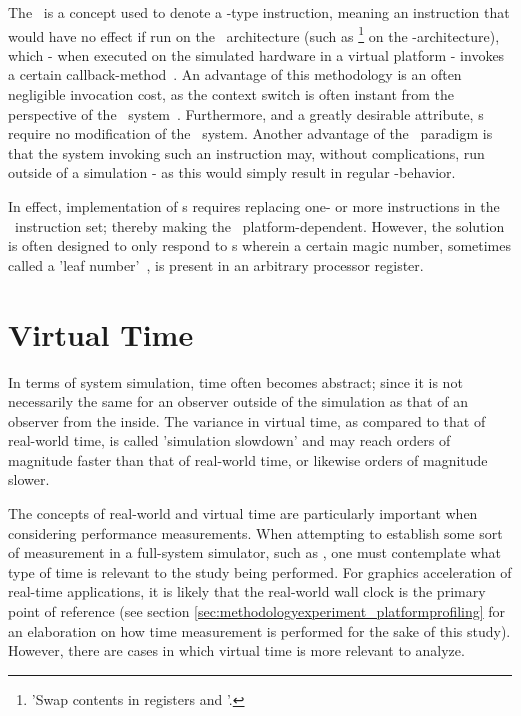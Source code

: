 The \dvttermmagicinstruction\ is a concept used to denote a -type instruction, meaning an instruction that would have no effect if run on the \dvttermtarget\ architecture (such as \footnote{'Swap contents in registers  and '.} on the \dvttermxeightysix -architecture), which - when executed on the simulated hardware in a virtual platform - invokes a certain callback-method~.
An advantage of this methodology is an often negligible invocation cost, as the context switch is often instant from the perspective of the \dvttermtarget\ system~.
Furthermore, and a greatly desirable attribute, \dvttermmagicinstruction s require no modification of the \dvttermtarget\ system.
Another advantage of the \dvttermmagicinstruction\ paradigm is that the system invoking such an instruction may, without complications, run outside of a simulation - as this would simply result in regular -behavior.

In effect, implementation of \dvttermmagicinstruction s requires replacing one- or more instructions in the \dvttermtarget\ instruction set; thereby making the \dvttermmagicinstruction\ platform-dependent.
However, the solution is often designed to only respond to \dvttermmagicinstruction s wherein a certain magic number, sometimes called a 'leaf number'~, is present in an arbitrary processor register.

\section{Virtual Time}
\label{sec:background_virtualtime}
In terms of system simulation, time often becomes abstract; since it is not necessarily the same for an observer outside of the simulation as that of an observer from the inside.
The variance in virtual time, as compared to that of real-world time, is called 'simulation slowdown' and may reach orders of magnitude faster than that of real-world time, or likewise orders of magnitude slower.

The concepts of real-world and virtual time are particularly important when considering performance measurements.
When attempting to establish some sort of measurement in a full-system simulator, such as \dvttermsimics , one must contemplate what type of time is relevant to the study being performed.
For graphics acceleration of real-time applications, it is likely that the real-world wall clock is the primary point of reference (see section \ref{sec:methodologyexperiment_platformprofiling} for an elaboration on how time measurement is performed for the sake of this study).
However, there are cases in which virtual time is more relevant to analyze.

